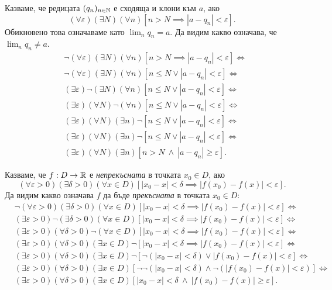 \begin{example}
  Казваме, че редицата $(q_n)_{n\in\mathbb{N}}$ е сходяща и клони към $a$, ако
  \[(\forall \varepsilon)(\exists N)(\forall n)[n > N \implies |a - q_n| < \varepsilon].\]
  Обикновено това означаваме като $\lim_n q_n = a$.
  Да видим какво означава, че $\lim_n q_n \neq a$.
  \begin{align*}
    & \neg (\forall \varepsilon)(\exists N)(\forall n)[n > N \implies |a - q_n| < \varepsilon] \iff \\
    & \neg (\forall \varepsilon)(\exists N)(\forall n)[n \leq N \vee |a - q_n| < \varepsilon] \iff \\
    & (\exists \varepsilon) \neg (\exists N)(\forall n)[n \leq N \vee |a - q_n| < \varepsilon] \iff \\
    & (\exists \varepsilon) (\forall N) \neg (\forall n)[n \leq N \vee |a - q_n| < \varepsilon] \iff \\
    & (\exists \varepsilon) (\forall N)(\exists n)\neg[n \leq N \vee |a - q_n| < \varepsilon] \iff \\
    & (\exists \varepsilon) (\forall N)(\exists n)\neg[n \leq N \vee |a - q_n| < \varepsilon] \iff \\
    & (\exists \varepsilon) (\forall N)(\exists n)[n > N\ \wedge\ |a - q_n| \geq \varepsilon].
  \end{align*}
\end{example}


\begin{example}
  Казваме, че $f:D \to \mathbb{R}$ е {\em непрекъсната} в точката $x_0 \in D$, ако 
  \[(\forall \varepsilon > 0)(\exists \delta >0)(\forall x\in D)[|x_0 - x| < \delta \implies |f(x_0) - f(x)| < \varepsilon].\]
  Да видим какво означава $f$ да бъде {\em прекъсната} в точката $x_0 \in D$:
  \begin{align*}
    & \neg (\forall \varepsilon > 0)(\exists \delta >0)(\forall x\in D)[|x_0 - x| < \delta \implies |f(x_0) - f(x)| < \varepsilon] \iff\\
    & (\exists \varepsilon > 0) \neg (\exists \delta >0)(\forall x\in D)[|x_0 - x| < \delta \implies |f(x_0) - f(x)| < \varepsilon] \iff \\
    & (\exists \varepsilon > 0)(\forall \delta >0)\neg(\forall x\in D)[|x_0 - x| < \delta \implies |f(x_0) - f(x)| < \varepsilon] \iff \\
    & (\exists \varepsilon > 0)(\forall \delta >0)(\exists x\in D)\neg[|x_0 - x| < \delta \implies |f(x_0) - f(x)| < \varepsilon] \iff \\
    & (\exists \varepsilon > 0)(\forall \delta >0)(\exists x\in D)\neg[\neg (|x_0 - x| <\delta) \vee |f(x_0) - f(x)| < \varepsilon] \iff \\
    & (\exists \varepsilon > 0)(\forall \delta >0)(\exists x\in D)[\neg\neg (|x_0 - x| <\delta) \land \neg (|f(x_0) - f(x)| < \varepsilon)] \iff \\
    & (\exists \varepsilon > 0)(\forall \delta >0)(\exists x\in D)[|x_0 - x| < \delta\ \land\ |f(x_0) - f(x)| \geq \varepsilon].
  \end{align*}
\end{example}

